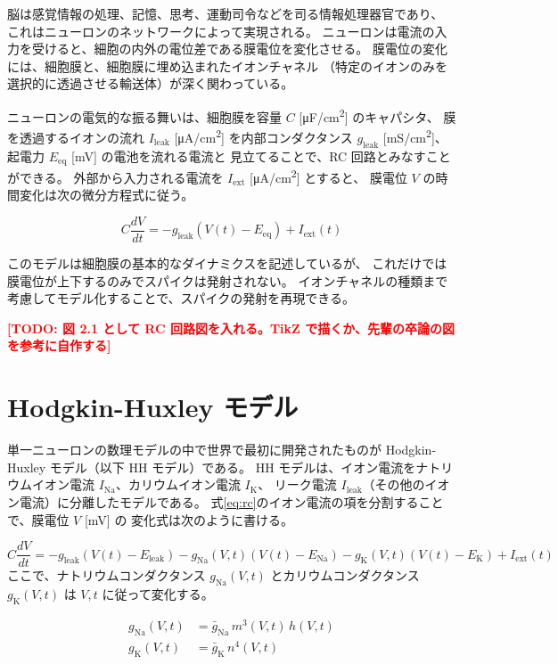 \documentclass[a4paper,11pt,openany]{ltjsreport}
\newcommand{\TODO}[1]{\textcolor{red}{\textbf{[TODO: #1]}}}
\newcommand{\Iext}{I_{\mathrm{ext}}}
\newcommand{\gleak}{g_{\mathrm{leak}}}
\newcommand{\gNa}{g_{\mathrm{Na}}}
\newcommand{\gK}{g_{\mathrm{K}}}
\newcommand{\ENa}{E_{\mathrm{Na}}}
\newcommand{\EK}{E_{\mathrm{K}}}
\newcommand{\Eleak}{E_{\mathrm{leak}}}
\newcommand{\Ileak}{I_{\mathrm{leak}}}
\newcommand{\INa}{I_{\mathrm{Na}}}
\newcommand{\IK}{I_{\mathrm{K}}}
\begin{document}
脳は感覚情報の処理、記憶、思考、運動司令などを司る情報処理器官であり、
これはニューロンのネットワークによって実現される。
ニューロンは電流の入力を受けると、細胞の内外の電位差である膜電位を変化させる。
膜電位の変化には、細胞膜と、細胞膜に埋め込まれたイオンチャネル
（特定のイオンのみを選択的に透過させる輸送体）が深く関わっている。

ニューロンの電気的な振る舞いは、細胞膜を容量 $C$ [\si{\micro F/cm^2}] のキャパシタ、
膜を透過するイオンの流れ $\Ileak$ [\si{\micro A/cm^2}] を内部コンダクタンス
$\gleak$ [\si{mS/cm^2}]、起電力 $E_{\mathrm{eq}}$ [\si{mV}] の電池を流れる電流と
見立てることで、RC 回路とみなすことができる\cite{miyagawa2013}。
外部から入力される電流を $\Iext$ [\si{\micro A/cm^2}] とすると、
膜電位 $V$ の時間変化は次の微分方程式に従う。

\begin{equation}
  C \frac{dV}{dt} = -\gleak\left(V(t) - E_{\mathrm{eq}}\right) + \Iext(t)
  \label{eq:rc}
\end{equation}

このモデルは細胞膜の基本的なダイナミクスを記述しているが、
これだけでは膜電位が上下するのみでスパイクは発射されない。
イオンチャネルの種類まで考慮してモデル化することで、スパイクの発射を再現できる。

\TODO{図 2.1 として RC 回路図を入れる。TikZ で描くか、先輩の卒論の図を参考に自作する}

\section{Hodgkin-Huxley モデル}
\label{sec:hh}

単一ニューロンの数理モデルの中で世界で最初に開発されたものが
Hodgkin-Huxley モデル（以下 HH モデル）である\cite{hodgkin1952}。
HH モデルは、イオン電流をナトリウムイオン電流 $\INa$、カリウムイオン電流 $\IK$、
リーク電流 $\Ileak$（その他のイオン電流）に分離したモデルである。
式\eqref{eq:rc}のイオン電流の項を分割することで、膜電位 $V$ [\si{mV}] の
変化式は次のように書ける。

\begin{equation}
  C\frac{dV}{dt} = -\gleak\left(V(t)-\Eleak\right)
                   -\gNa(V,t)\left(V(t)-\ENa\right)
                   -\gK(V,t)\left(V(t)-\EK\right) + \Iext(t)
  \label{eq:hh_v}
\end{equation}
ここで、ナトリウムコンダクタンス $\gNa(V,t)$ とカリウムコンダクタンス $\gK(V,t)$ は
$V, t$ に従って変化する。

\begin{align}
  \gNa(V,t) &= \bar{g}_{\mathrm{Na}}\, m^3(V,t)\, h(V,t) \label{eq:gna}\\
  \gK(V,t)  &= \bar{g}_{\mathrm{K}}\, n^4(V,t)           \label{eq:gk}
\end{align}
\end{document}
